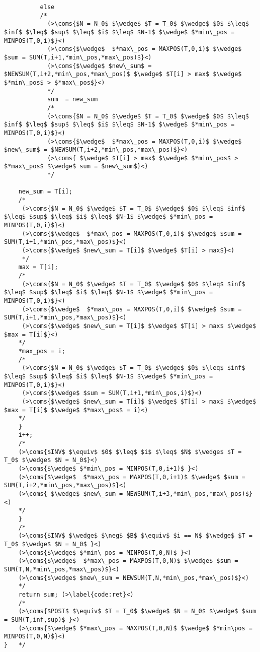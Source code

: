 \begin{lstlisting}
          else
          /*
            (>\coms{$N = N_0$ $\wedge$ $T = T_0$ $\wedge$ $0$ $\leq$ $inf$ $\leq$ $sup$ $\leq$ $i$ $\leq$ $N-1$ $\wedge$ $*min\_pos = MINPOS(T,0,i)$}<)
            (>\coms{$\wedge$  $*max\_pos = MAXPOS(T,0,i)$ $\wedge$ $sum = SUM(T,i+1,*min\_pos,*max\_pos)$}<)
            (>\coms{$\wedge$ $new\_sum$ = $NEWSUM(T,i+2,*min\_pos,*max\_pos)$ $\wedge$ $T[i] > max$ $\wedge$ $*min\_pos$ > $*max\_pos$}<) 
            */
            sum  = new_sum
            /*
            (>\coms{$N = N_0$ $\wedge$ $T = T_0$ $\wedge$ $0$ $\leq$ $inf$ $\leq$ $sup$ $\leq$ $i$ $\leq$ $N-1$ $\wedge$ $*min\_pos = MINPOS(T,0,i)$}<)
            (>\coms{$\wedge$  $*max\_pos = MAXPOS(T,0,i)$ $\wedge$ $new\_sum$ = $NEWSUM(T,i+2,*min\_pos,*max\_pos)$}<)
            (>\coms{ $\wedge$ $T[i] > max$ $\wedge$ $*min\_pos$ > $*max\_pos$ $\wedge$ sum = $new\_sum$}<) 
            */

    new_sum = T[i];
    /*
     (>\coms{$N = N_0$ $\wedge$ $T = T_0$ $\wedge$ $0$ $\leq$ $inf$ $\leq$ $sup$ $\leq$ $i$ $\leq$ $N-1$ $\wedge$ $*min\_pos = MINPOS(T,0,i)$}<)
     (>\coms{$\wedge$  $*max\_pos = MAXPOS(T,0,i)$ $\wedge$ $sum = SUM(T,i+1,*min\_pos,*max\_pos)$}<)
     (>\coms{$\wedge$ $new\_sum = T[i]$ $\wedge$ $T[i] > max$}<)
     */
    max = T[i];
    /*
     (>\coms{$N = N_0$ $\wedge$ $T = T_0$ $\wedge$ $0$ $\leq$ $inf$ $\leq$ $sup$ $\leq$ $i$ $\leq$ $N-1$ $\wedge$ $*min\_pos = MINPOS(T,0,i)$}<)
     (>\coms{$\wedge$  $*max\_pos = MAXPOS(T,0,i)$ $\wedge$ $sum = SUM(T,i+1,*min\_pos,*max\_pos)$}<)
     (>\coms{$\wedge$ $new\_sum = T[i]$ $\wedge$ $T[i] > max$ $\wedge$ $max = T[i]$}<)
    */
    *max_pos = i;
    /*
     (>\coms{$N = N_0$ $\wedge$ $T = T_0$ $\wedge$ $0$ $\leq$ $inf$ $\leq$ $sup$ $\leq$ $i$ $\leq$ $N-1$ $\wedge$ $*min\_pos = MINPOS(T,0,i)$}<)
     (>\coms{$\wedge$ $sum = SUM(T,i+1,*min\_pos,i)$}<)
     (>\coms{$\wedge$ $new\_sum = T[i]$ $\wedge$ $T[i] > max$ $\wedge$ $max = T[i]$ $\wedge$ $*max\_pos$ = i}<)
    */
    }
    i++;
    /*
    (>\coms{$INV$ $\equiv$ $0$ $\leq$ $i$ $\leq$ $N$ $\wedge$ $T = T_0$ $\wedge$ $N = N_0$}<)
    (>\coms{$\wedge$ $*min\_pos = MINPOS(T,0,i+1)$ }<)
    (>\coms{$\wedge$  $*max\_pos = MAXPOS(T,0,i+1)$ $\wedge$ $sum = SUM(T,i+2,*min\_pos,*max\_pos)$}<)
    (>\coms{ $\wedge$ $new\_sum = NEWSUM(T,i+3,*min\_pos,*max\_pos)$}<)
    */
    }
    /*
    (>\coms{$INV$ $\wedge$ $\neg$ $B$ $\equiv$ $i == N$ $\wedge$ $T = T_0$ $\wedge$ $N = N_0$ }<)
    (>\coms{$\wedge$ $*min\_pos = MINPOS(T,0,N)$ }<)
    (>\coms{$\wedge$  $*max\_pos = MAXPOS(T,0,N)$ $\wedge$ $sum = SUM(T,N,*min\_pos,*max\_pos)$}<)
    (>\coms{$\wedge$ $new\_sum = NEWSUM(T,N,*min\_pos,*max\_pos)$}<)
    */
    return sum; (>\label{code:ret}<)
    /*
    (>\coms{$POST$ $\equiv$ $T = T_0$ $\wedge$ $N = N_0$ $\wedge$ $sum = SUM(T,inf,sup)$ }<)
    (>\coms{$\wedge$ $*max\_pos = MAXPOS(T,0,N)$ $\wedge$ $*min\pos = MINPOS(T,0,N)$}<)
}   */
\end{lstlisting}

